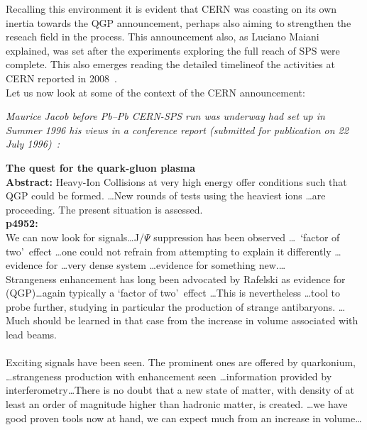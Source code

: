 Recalling this environment it is evident that CERN was coasting on its own inertia towards the QGP announcement, perhaps also aiming to strengthen the reseach field in the process. This announcement also, as Luciano Maiani explained, was set after the experiments exploring the full reach of SPS were complete. This also emerges reading the detailed timelineof the activities at CERN reported in 2008~\cite{Heinz:2008ds}.\\

Let us now look at some of the context of the CERN announcement:

\noindent \textit{Maurice Jacob before Pb--Pb CERN-SPS run was underway had set up in Summer 1996 his views in a conference report (submitted for publication on 22 July 1996)~\cite{Jacob:1991pb}:}\\[-0.7cm]
%
\begin{mdframed}[linecolor=gray,roundcorner=12pt,backgroundcolor=GreenYellow!15,linewidth=1pt,leftmargin=0cm,rightmargin=0cm,topline=true,bottomline=true,skipabove=12pt]\relax%
%
\textbf{The quest for the quark-gluon plasma}\label{Jacob1996}\\
{\bf Abstract:} Heavy-Ion Collisions at very high energy offer conditions such that QGP could be formed. \ldots New rounds of tests using the heaviest ions \ldots are proceeding. The present situation is assessed.\\

 \textbf{p4952:}\\ 
 \indent We can now look for signals\ldots J/$\Psi$ suppression has been observed \ldots\ \lq fac\-tor of two\rq\ effect \ldots one could not refrain from attempting to explain it differently \ldots evidence for \ldots very dense system \ldots evidence for something new.\ldots\\

Strangeness enhancement has long been advocated by Rafelski as evidence for (QGP)\ldots again typically a \lq factor of two\rq\ effect \ldots This is nevertheless \ldots tool to probe further, studying in particular the production of strange antibaryons. \ldots Much should be learned in that case from the increase in volume associated with lead beams.\\

\\
\indent Exciting signals have been seen. The prominent ones are offered by quarkonium, \ldots strangeness production with enhancement seen \ldots information provided by interferometry\ldots There is no doubt that a new state of matter, with density of at least an order of magnitude higher than hadronic matter, is created. \ldots we have good proven tools now at hand, we can expect much from an increase in volume\ldots
%
\end{mdframed}

